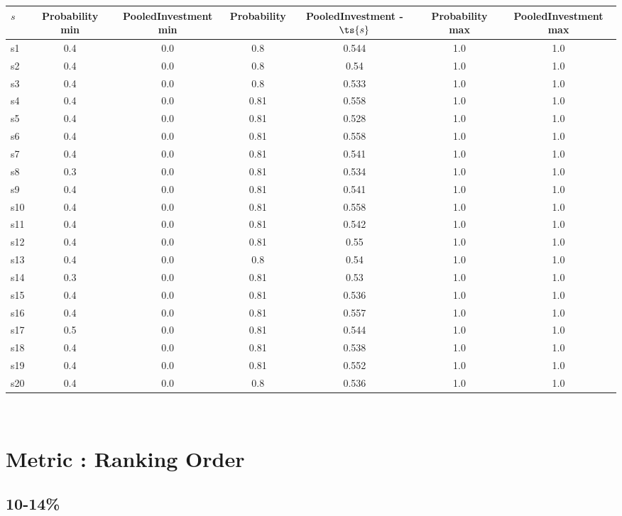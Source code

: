 \documentclass{article}
\begin{document}
\noindent\begin{tabular}{|l|c|c|c|c|c|c|}
\hline
$s$& Probability min & PooledInvestment min & Probability & PooledInvestment - $\ts{s}$ & Probability max & PooledInvestment max\\
\hline
s1 &0.4 & 0.0 & 0.8 & 0.544 & 1.0 & 1.0\\
\hline
s2 &0.4 & 0.0 & 0.8 & 0.54 & 1.0 & 1.0\\
\hline
s3 &0.4 & 0.0 & 0.8 & 0.533 & 1.0 & 1.0\\
\hline
s4 &0.4 & 0.0 & 0.81 & 0.558 & 1.0 & 1.0\\
\hline
s5 &0.4 & 0.0 & 0.81 & 0.528 & 1.0 & 1.0\\
\hline
s6 &0.4 & 0.0 & 0.81 & 0.558 & 1.0 & 1.0\\
\hline
s7 &0.4 & 0.0 & 0.81 & 0.541 & 1.0 & 1.0\\
\hline
s8 &0.3 & 0.0 & 0.81 & 0.534 & 1.0 & 1.0\\
\hline
s9 &0.4 & 0.0 & 0.81 & 0.541 & 1.0 & 1.0\\
\hline
s10 &0.4 & 0.0 & 0.81 & 0.558 & 1.0 & 1.0\\
\hline
s11 &0.4 & 0.0 & 0.81 & 0.542 & 1.0 & 1.0\\
\hline
s12 &0.4 & 0.0 & 0.81 & 0.55 & 1.0 & 1.0\\
\hline
s13 &0.4 & 0.0 & 0.8 & 0.54 & 1.0 & 1.0\\
\hline
s14 &0.3 & 0.0 & 0.81 & 0.53 & 1.0 & 1.0\\
\hline
s15 &0.4 & 0.0 & 0.81 & 0.536 & 1.0 & 1.0\\
\hline
s16 &0.4 & 0.0 & 0.81 & 0.557 & 1.0 & 1.0\\
\hline
s17 &0.5 & 0.0 & 0.81 & 0.544 & 1.0 & 1.0\\
\hline
s18 &0.4 & 0.0 & 0.81 & 0.538 & 1.0 & 1.0\\
\hline
s19 &0.4 & 0.0 & 0.81 & 0.552 & 1.0 & 1.0\\
\hline
s20 &0.4 & 0.0 & 0.8 & 0.536 & 1.0 & 1.0\\
\hline
\end{tabular}\\

\newpage
\section{Metric : Ranking Order}

\newpage

\subsection{10-14\%}
\end{document}
